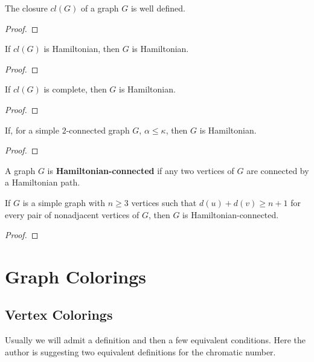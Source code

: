 \begin{theorem}
	The closure $cl(G)$ of a graph $G$ is well defined.
\end{theorem}
\begin{proof}
\end{proof}

\begin{theorem}
	If $cl(G)$ is Hamiltonian, then $G$ is Hamiltonian.
\end{theorem}
\begin{proof}
\end{proof}

\begin{corollary}
	If $cl(G)$ is complete, then $G$ is Hamiltonian.
\end{corollary}
\begin{proof}
\end{proof}

\begin{theorem}
	If, for a simple $2$-connected graph $G$, $\alpha \le \kappa$, then $G$ is Hamiltonian.
\end{theorem}
\begin{proof}
\end{proof}

\begin{definition}
	A graph $G$ is \textbf{Hamiltonian-connected} if any two vertices of $G$ are connected by a Hamiltonian path.
\end{definition}

 \begin{theorem}
	If $G$ is a simple graph with $n \ge 3$ vertices such that $d(u)+d(v) \ge n+1$ for every pair of nonadjacent vertices of $G$, then $G$ is Hamiltonian-connected.
\end{theorem}
\begin{proof}
\end{proof}

\section{Graph Colorings}
\setcounter{subsection}{1}
\subsection{Vertex Colorings}
\begin{commentary}
	Usually we will admit a definition and then a few equivalent conditions. Here the author is suggesting two equivalent definitions for the chromatic number.
\end{commentary}


